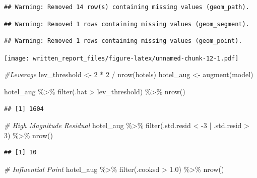 \documentclass[
]{article}
\newenvironment{Shaded}{\begin{snugshade}}{\end{snugshade}}
\newcommand{\CommentTok}[1]{\textcolor[rgb]{0.56,0.35,0.01}{\textit{#1}}}
\newcommand{\DecValTok}[1]{\textcolor[rgb]{0.00,0.00,0.81}{#1}}
\newcommand{\FloatTok}[1]{\textcolor[rgb]{0.00,0.00,0.81}{#1}}
\newcommand{\FunctionTok}[1]{\textcolor[rgb]{0.00,0.00,0.00}{#1}}
\newcommand{\NormalTok}[1]{#1}
\newcommand{\OtherTok}[1]{\textcolor[rgb]{0.56,0.35,0.01}{#1}}
\newcommand{\SpecialCharTok}[1]{\textcolor[rgb]{0.00,0.00,0.00}{#1}}
\begin{document}
\begin{verbatim}
## Warning: Removed 14 row(s) containing missing values (geom_path).
\end{verbatim}

\begin{verbatim}
## Warning: Removed 1 rows containing missing values (geom_segment).
\end{verbatim}

\begin{verbatim}
## Warning: Removed 1 rows containing missing values (geom_point).
\end{verbatim}

\texttt{[image: written\_report\_files/figure-latex/unnamed-chunk-12-1.pdf]}

\begin{Shaded}
\begin{Highlighting}[]
\CommentTok{\#Leverage }
\NormalTok{lev\_threshold }\OtherTok{\textless{}{-}} \DecValTok{2} \SpecialCharTok{*} \DecValTok{2} \SpecialCharTok{/} \FunctionTok{nrow}\NormalTok{(hotels) }
\NormalTok{hotel\_aug }\OtherTok{\textless{}{-}} \FunctionTok{augment}\NormalTok{(model) }

\NormalTok{hotel\_aug }\SpecialCharTok{\%\textgreater{}\%}
\FunctionTok{filter}\NormalTok{(.hat }\SpecialCharTok{\textgreater{}}\NormalTok{ lev\_threshold) }\SpecialCharTok{\%\textgreater{}\%} \FunctionTok{nrow}\NormalTok{()}
\end{Highlighting}
\end{Shaded}

\begin{verbatim}
## [1] 1604
\end{verbatim}

\begin{Shaded}
\begin{Highlighting}[]
\CommentTok{\# High Magnitude Residual }
\NormalTok{hotel\_aug }\SpecialCharTok{\%\textgreater{}\%}
\FunctionTok{filter}\NormalTok{(.std.resid }\SpecialCharTok{\textless{}} \SpecialCharTok{{-}}\DecValTok{3} \SpecialCharTok{|}\NormalTok{ .std.resid }\SpecialCharTok{\textgreater{}} \DecValTok{3}\NormalTok{) }\SpecialCharTok{\%\textgreater{}\%} \FunctionTok{nrow}\NormalTok{()}
\end{Highlighting}
\end{Shaded}

\begin{verbatim}
## [1] 10
\end{verbatim}

\begin{Shaded}
\begin{Highlighting}[]
\CommentTok{\# Influential Point }
\NormalTok{hotel\_aug }\SpecialCharTok{\%\textgreater{}\%}
\FunctionTok{filter}\NormalTok{(.cooksd }\SpecialCharTok{\textgreater{}} \FloatTok{1.0}\NormalTok{) }\SpecialCharTok{\%\textgreater{}\%} \FunctionTok{nrow}\NormalTok{()}
\end{Highlighting}
\end{Shaded}
\end{document}

